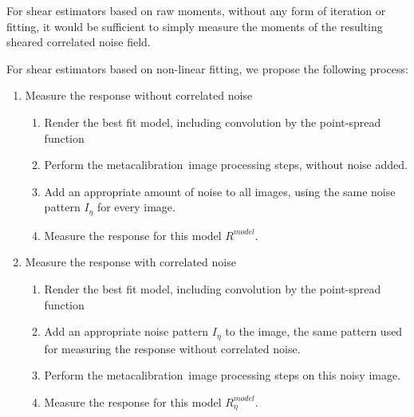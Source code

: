 \documentclass[usegraphicx,usenatbib]{mn2e}
\newcommand{\mcal}{metacalibration}
\begin{document}
For shear estimators based on raw moments, without any form of iteration or
fitting, it would be sufficient to simply measure the moments of the resulting
sheared correlated noise field.

For shear estimators based on non-linear fitting, we propose the following
process:
\newpage
\begin{enumerate}[label=\arabic*.]

    \item Measure the response without correlated noise
    
        \begin{enumerate}[label*=\arabic*.]
            \item Render the best fit model, including convolution by the point-spread
                function

            \item Perform the \mcal\ image processing steps, without noise added.

            \item Add an appropriate amount of noise to all images, using the
                same noise pattern $I_\eta$ for every image.

            \item Measure the response for this model $R^{model}$.
        \end{enumerate}

    \item Measure the response with correlated noise
    
        \begin{enumerate}[label*=\arabic*.]
            \item Render the best fit model, including convolution by the point-spread
                function

            \item Add an appropriate noise pattern $I_\eta$ to the image, the
                same pattern used for measuring the response without correlated
                noise.

            \item Perform the \mcal\ image processing steps on this noisy
                image.

            \item Measure the response for this model $R^{model}_{\eta}$.

        \end{enumerate}

\end{enumerate}
\end{document}
